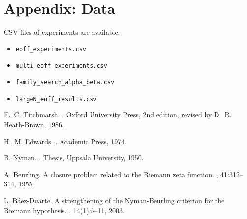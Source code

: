 \documentclass[11pt]{article}
\theoremstyle{plain}
\begin{document}
\section*{Appendix: Data}
CSV files of experiments are available:
\begin{itemize}
\item \texttt{eoff\_experiments.csv}
\item \texttt{multi\_eoff\_experiments.csv}
\item \texttt{family\_search\_alpha\_beta.csv}
\item \texttt{largeN\_eoff\_results.csv}
\end{itemize}


\begin{thebibliography}{10}

E.~C. Titchmarsh.
.
\newblock Oxford University Press, 2nd edition, revised by D.~R. Heath-Brown, 1986.

H.~M. Edwards.
.
\newblock Academic Press, 1974.

B. Nyman.
.
\newblock Thesis, Uppsala University, 1950.

A. Beurling.
\newblock A closure problem related to the Riemann zeta function.
, 41:312--314, 1955.

L. Báez-Duarte.
\newblock A strengthening of the Nyman-Beurling criterion for the Riemann hypothesis.
, 14(1):5--11, 2003.

\end{thebibliography}
\end{document}
